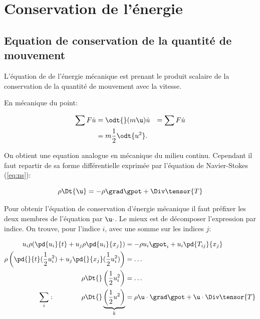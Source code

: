 \chapter{Conservation de l'énergie \label{ch:energie}}

\section{Equation de conservation de la quantité de mouvement}

L'équation de  de l'énergie mécanique est  prenant le produit scalaire de la conservation de la quantité de mouvement avec la vitesse. 

En mécanique du point: 

\begin{displaymath}
  \begin{split}
    \sum F \dot u &= \odt{}(m\u) \dot u &= \sum F \dot u  \\
                  &= m \frac{1}{2} \odt{u^2}. 
  \end{split}
\end{displaymath}

On obtient une equation analogue en mécanique du milieu continu.  Cependant il faut repartir de sa forme différentielle exprimée par l'équation de Navier-Stokes (\eqref{eq:ns}):


\begin{displaymath}
  \rho\Dt{\u} = - \rho \grad \gpot + \Div \tensor{T}
\end{displaymath}

Pour obtenir l'équation de conservation d'énergie mécanique il faut préfixer les deux membres de l'équation par $\u\cdot$. Le mieux est de décomposer l'expression par indice. On trouve, pour l'indice $i$, avec une somme sur les indices $j$:

\begin{displaymath}
  \begin{split}
    u_i  \rho (\pd{u_i}{t} + u_j \rho\pd{u_i}{x_j}) &= - \rho u_i \gpot_i + u_i \pd{T_{ij}}{x_j}  \\
    \rho \left( \pd{}{t}(\frac{1}{2}u_i^2) + u_j \pd{}{x_j}(\frac{1}{2}u_i^2) \right) &= \ldots \\
  \rho \Dt{}\left(\frac{1}{2}u_i^2\right)  &= \ldots \\
  \sum_i: \hspace{4em}  \rho \Dt{}\underbrace{\left(\frac{1}{2}u^2\right)}_{k}  &= \rho \u \cdot \grad \gpot + \u \cdot \Div \tensor{T}
  \end{split}
\end{displaymath}

